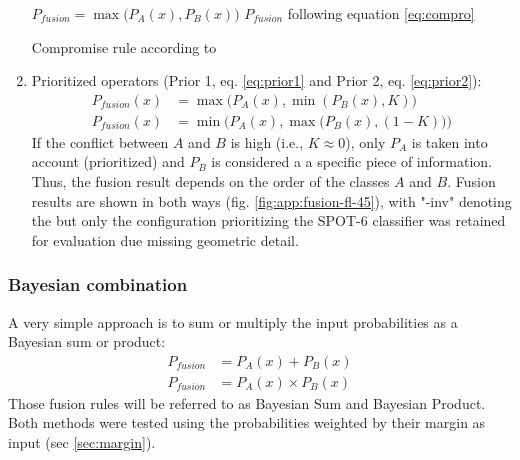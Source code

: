 \documentclass[10pt]{article}
\begin{document}
\begin{enumerate}
    \begin{algorithm}[H]
        \begin{algorithmic}
            \State $P_{fusion}=\max\big(P_A(x),P_B(x)\big)$
            \Else
            \State $P_{fusion}$ following equation \ref{eq:compro}
            \EndIf
        \end{algorithmic}
        \caption{Compromise rule according to \cite{ouerghemmi_two-step_2017}}
        \label{alg:comp-wo}
    \end{algorithm}
    \item Prioritized operators (Prior 1, eq. \ref{eq:prior1} and Prior 2, eq. \ref{eq:prior2}):
    \begin{align}
        P_{fusion}(x)&=\max\Big(P_A(x),\min(P_B(x),K)\Big)\label{eq:prior1}\\
        P_{fusion}(x)&=\min\Big(P_A(x),\max\big(P_B(x),(1-K)\big)\Big)\label{eq:prior2}
    \end{align}
    If the conflict between $A$ and $B$ is high (i.e., $K\approx 0$), only $P_A$ is taken into account (prioritized) and $P_B$ is considered a a specific piece of information. Thus, the fusion result depends on the order of the classes $A$ and $B$. Fusion results are shown in both ways (fig. \ref{fig:app:fusion-fl-45}), with "-inv" denoting the  but only the configuration prioritizing the SPOT-6 classifier was retained for evaluation due missing geometric detail.  
\end{enumerate}

\subsubsection{Bayesian combination}\label{sec:bayesian}
A very simple approach is to sum or multiply the input probabilities as a Bayesian sum or product:
\begin{align}
    P_{fusion}&=P_A(x)+P_B(x)\\
    P_{fusion}&=P_A(x)\times P_B(x)
\end{align}
Those fusion rules will be referred to as Bayesian Sum and Bayesian Product. Both methods were tested using the probabilities weighted by their margin as input (sec \ref{sec:margin}).
\end{document}
